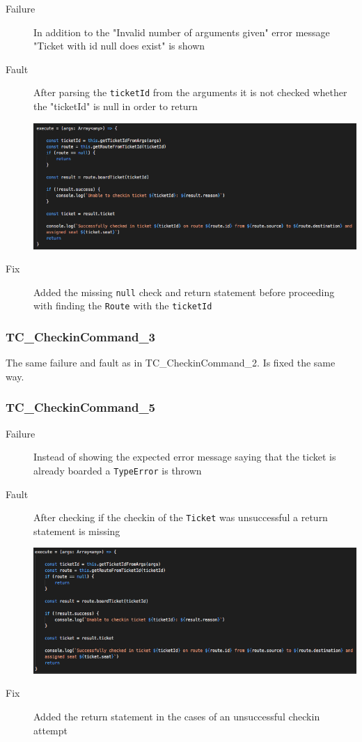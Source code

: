 \documentclass[11pt]{article}
\begin{document}
\begin{description}
\item[{Failure}] In addition to the "Invalid number of arguments given" error message "Ticket with id null does exist" is shown
\item[{Fault}] After parsing the \texttt{ticketId} from the arguments it is not checked whether the "ticketId" is null in order to return
\begin{center}
\includegraphics[width=.9\linewidth]{./Iteration3.rtfd/Pasted Graphic 10.tiff.png}
\end{center}
\item[{Fix}] Added the missing \texttt{null} check and return statement before proceeding with finding the \texttt{Route} with the \texttt{ticketId}
\end{description}

\subsubsection{TC\_CheckinCommand\_3}
\label{sec:org7709468}

The same failure and fault as in TC\_CheckinCommand\_2. Is fixed the same way.

\subsubsection{TC\_CheckinCommand\_5}
\label{sec:orgbb84e46}

\begin{description}
\item[{Failure}] Instead of showing the expected error message saying that the ticket is already boarded a \texttt{TypeError} is thrown
\item[{Fault}] After checking if the checkin of the \texttt{Ticket} was unsuccessful a return statement is missing
\begin{center}
\includegraphics[width=.9\linewidth]{./Iteration3.rtfd/Pasted Graphic 11.tiff.png}
\end{center}
\item[{Fix}] Added the return statement in the cases of an unsuccessful checkin attempt
\end{description}
\end{document}
